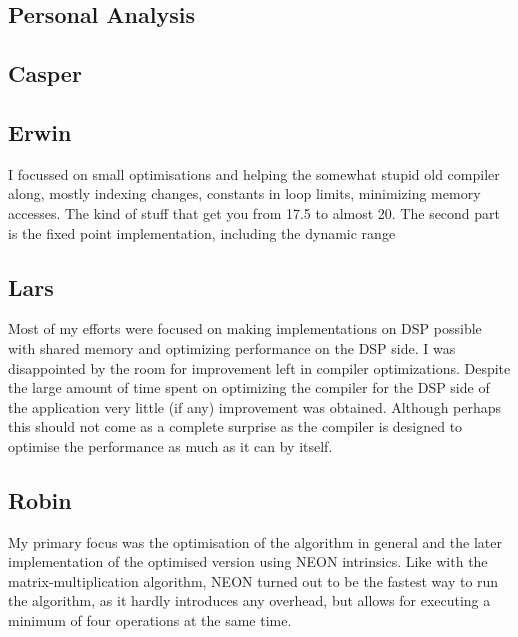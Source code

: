 \documentclass[final]{article} %
\begin{document}
\begin{appendices}

\section{Personal Analysis}\label{app:appendix-personal-analysis}

\subsection{Casper}


\subsection{Erwin}
I focussed on small optimisations and helping the somewhat stupid old compiler along, mostly indexing changes, constants in loop limits, minimizing memory accesses.
The kind of stuff that get you from \SI{17.5}{\speedup} to almost \SI{20}{\speedup}.
The second part is the fixed point implementation, including the dynamic range 


\subsection{Lars}
Most of my efforts were focused on making implementations on DSP possible with shared memory and optimizing performance on the DSP side.
I was disappointed by the room for improvement left in compiler optimizations.
Despite the large amount of time spent on optimizing the compiler for the DSP side of the application very little (if any) improvement was obtained.
Although perhaps this should not come as a complete surprise as the compiler is designed to optimise the performance as much as it can by itself.

\subsection{Robin}
My primary focus was the optimisation of the algorithm in general and the later implementation of the optimised version using NEON intrinsics.
Like with the matrix-multiplication algorithm, NEON turned out to be the fastest way to run the algorithm, as it hardly introduces any overhead, but allows for executing a minimum of four operations at the same time.


\end{appendices}
\end{document}
